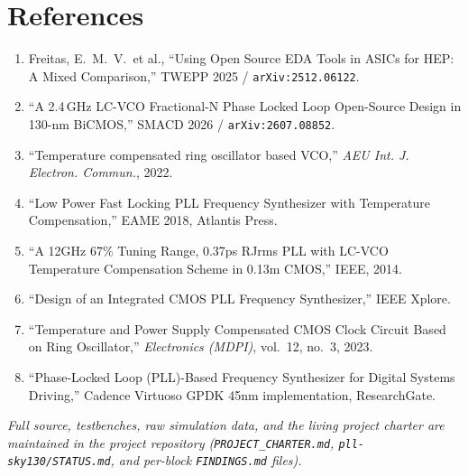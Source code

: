 \documentclass[11pt]{article}
\begin{document}
\section{References}

\begin{enumerate}[leftmargin=1.5em]
  \item Freitas, E.\ M.\ V.\ et al., ``Using Open Source EDA Tools in ASICs for HEP: A Mixed Comparison,'' TWEPP 2025 / \texttt{arXiv:2512.06122}.
  \item ``A 2.4\,GHz LC-VCO Fractional-N Phase Locked Loop Open-Source Design in 130-nm BiCMOS,'' SMACD 2026 / \texttt{arXiv:2607.08852}.
  \item ``Temperature compensated ring oscillator based VCO,'' \emph{AEU Int. J. Electron. Commun.}, 2022.
  \item ``Low Power Fast Locking PLL Frequency Synthesizer with Temperature Compensation,'' EAME 2018, Atlantis Press.
  \item ``A 12GHz 67\% Tuning Range, 0.37ps RJrms PLL with LC-VCO Temperature Compensation Scheme in 0.13\textmu m CMOS,'' IEEE, 2014.
  \item ``Design of an Integrated CMOS PLL Frequency Synthesizer,'' IEEE Xplore.
  \item ``Temperature and Power Supply Compensated CMOS Clock Circuit Based on Ring Oscillator,'' \emph{Electronics (MDPI)}, vol.\ 12, no.\ 3, 2023.
  \item ``Phase-Locked Loop (PLL)-Based Frequency Synthesizer for Digital Systems Driving,'' Cadence Virtuoso GPDK 45nm implementation, ResearchGate.
\end{enumerate}

\vspace{1cm}
\noindent\textit{Full source, testbenches, raw simulation data, and the living project charter are maintained in the project repository (\texttt{PROJECT\_CHARTER.md}, \texttt{pll-sky130/STATUS.md}, and per-block \texttt{FINDINGS.md} files).}
\end{document}
